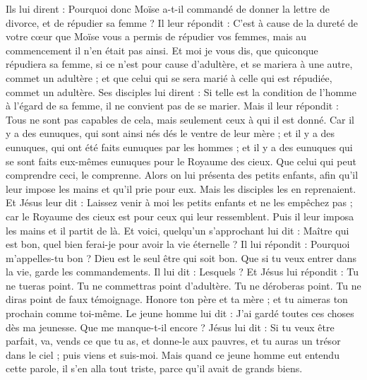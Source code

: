 \begin{multicols}{2}
Ils lui dirent : Pourquoi donc Moïse a-t-il commandé de donner la lettre de divorce, et de répudier sa femme ?
Il leur répondit : C'est à cause de la dureté de votre cœur que Moïse vous a permis de répudier vos femmes, mais au commencement il n'en était pas ainsi.
Et moi je vous dis, que quiconque répudiera sa femme, si ce n'est pour cause d'adultère, et se mariera à une autre, commet un adultère ; et que celui qui se sera marié à celle qui est répudiée, commet un adultère.
Ses disciples lui dirent : Si telle est la condition de l'homme à l'égard de sa femme, il ne convient pas de se marier.
Mais il leur répondit : Tous ne sont pas capables de cela, mais seulement ceux à qui il est donné.
Car il y a des eunuques, qui sont ainsi nés dés le ventre de leur mère ; et il y a des eunuques, qui ont été faits eunuques par les hommes ; et il y a des eunuques qui se sont faits eux-mêmes eunuques pour le Royaume des cieux. Que celui qui peut comprendre ceci, le comprenne.
Alors on lui présenta des petits enfants, afin qu'il leur impose les mains et qu'il prie pour eux. Mais les disciples les en reprenaient.
Et Jésus leur dit : Laissez venir à moi les petits enfants et ne les empêchez pas ; car le Royaume des cieux est pour ceux qui leur ressemblent.
Puis il leur imposa les mains et il partit de là.
Et voici, quelqu'un s'approchant lui dit : Maître qui est bon, quel bien ferai-je pour avoir la vie éternelle ?
Il lui répondit : Pourquoi m'appelles-tu bon ? Dieu est le seul être qui soit bon. Que si tu veux entrer dans la vie, garde les commandements.
Il lui dit : Lesquels ? Et Jésus lui répondit : Tu ne tueras point. Tu ne commettras point d'adultère. Tu ne déroberas point. Tu ne diras point de faux témoignage.
Honore ton père et ta mère ; et tu aimeras ton prochain comme toi-même.
Le jeune homme lui dit : J'ai gardé toutes ces choses dès ma jeunesse. Que me manque-t-il encore ?
Jésus lui dit : Si tu veux être parfait, va, vends ce que tu as, et donne-le aux pauvres, et tu auras un trésor dans le ciel ; puis viens et suis-moi.
Mais quand ce jeune homme eut entendu cette parole, il s'en alla tout triste, parce qu'il avait de grands biens.

\end{multicols}

